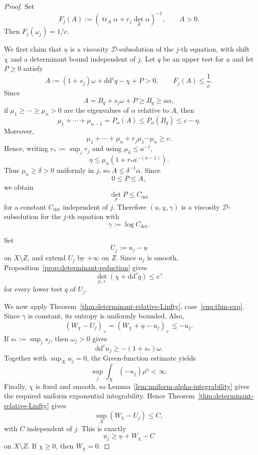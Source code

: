\documentclass[oneside,english,letterpaper]{amsart}
\numberwithin{equation}{section}
\theoremstyle{plain}
\theoremstyle{definition}
\theoremstyle{remark}
\renewcommand{\d}{\mathrm{d}}
\newcommand{\ddc}{\d\d^c}
\def\tr{\operatorname{tr}}
\begin{document}
\begin{proof}
Set
$$
F_j(A):=
\left(\tr_A\alpha+r_j\det_A\alpha\right)^{-1},
\qquad A>0.
$$
Then $F_j(\omega_j)=1/c$.

We first claim that $\underline u$ is a viscosity $\mathcal D$-subsolution of the
$j$-th equation, with shift $\chi$ and a determinant bound independent
of $j$. Let $q$ be an upper test for $\underline u$ and let $P\geq 0$
satisfy
$$
A:=(1+s_j)\omega+\ddc q-\chi+P>0,
\qquad
F_j(A)\leq \frac1c.
$$
Since
$$
A=B_q+s_j\omega+P\geq B_q\geq a\alpha,
$$
if $\mu_1\geq\cdots\geq\mu_n>0$ are the eigenvalues of $\alpha$
relative to $A$, then
$$
\mu_1+\cdots+\mu_{n-1}
=
P_\alpha(A)
\leq
P_\alpha(B_q)
\leq c-\eta.
$$
Moreover,
$$
\mu_1+\cdots+\mu_n+r_j\mu_1\cdots\mu_n\geq c.
$$
Hence, writing $r_*:=\sup_j r_j$ and using $\mu_k\leq a^{-1}$,
$$
\eta
\leq
\mu_n\left(1+r_*a^{-(n-1)}\right).
$$
Thus $\mu_n\geq\delta>0$ uniformly in $j$, so $A\leq\delta^{-1}\alpha$.
Since
$$
0\leq P\leq A,
$$
we obtain
$$
\det_\rho P\leq C_{\det}
$$
for a constant $C_{\det}$ independent of $j$. Therefore
$(\underline u,\chi,\gamma)$ is a viscosity $\mathcal D$-subsolution for the
$j$-th equation with
$$
\gamma:=\log C_{\det}.
$$

Set
$$
U_j:=u_j-\underline u
$$
on $X\setminus Z$, and extend $U_j$ by $+\infty$ on $Z$.
Since $u_j$ is smooth, Proposition~\ref{prop:determinant-reduction} gives
$$
\det_{\rho,+}(\chi+\ddc q)\leq e^\gamma
$$
for every lower test $q$ of $U_j$.

We now apply Theorem~\ref{thm:determinant-relative-Linfty}, case~\ref{enu:thm-exp}. Since $\gamma$ is constant,
its entropy is uniformly bounded. Also,
$$
(W_\chi-U_j)_+
=
(W_\chi+\underline u-u_j)_+
\leq -u_j.
$$
If $s_*:=\sup_j s_j$, then $\omega_j>0$ gives
$$
\ddc u_j\geq -(1+s_*)\omega.
$$
Together with $\sup_Xu_j=0$, the Green-function estimate yields
$$
\sup_j\int_X(-u_j)\rho^n<\infty.
$$
Finally, $\chi$ is fixed and smooth, so Lemma~\ref{lem:uniform-alpha-integrability} gives the required
uniform exponential integrability. Hence Theorem~\ref{thm:determinant-relative-Linfty} gives
$$
\sup_X(W_\chi-U_j)\leq C,
$$
with $C$ independent of $j$. This is exactly
$$
u_j\geq \underline u+W_\chi-C
$$
on $X\setminus Z$. If $\chi\geq 0$, then $W_\chi=0$.
\end{proof}
\end{document}
